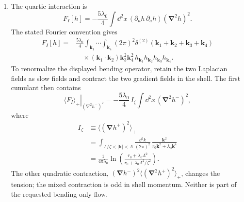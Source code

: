 \begin{enumerate}
\begin{enumerate}
    \item[(c)]
    The quartic interaction is
    \[
      F_I[h]=-\frac{5\lambda_0}{4}\int \dd^2x\,
        (\partial_a h\,\partial_a h)(\boldsymbol\nabla^2h)^2.
    \]
    The stated Fourier convention gives
    \[
      \begin{split}
      F_I[h]
      ={}&\frac{5\lambda_0}{4}
        \int_{\mathbf k_1}\!\cdots\!\int_{\mathbf k_4}
        (2\pi)^2\delta^{(2)}
          (\mathbf k_1+\mathbf k_2+\mathbf k_3+\mathbf k_4)\\
      &\quad{}\times
        (\mathbf k_1\!\cdot\!\mathbf k_2)
        \mathbf k_3^2\mathbf k_4^2\,
        h_{\mathbf k_1}h_{\mathbf k_2}
        h_{\mathbf k_3}h_{\mathbf k_4}.
      \end{split}
      \tag{18.3.S4}
    \]
    To renormalize the displayed bending operator, retain the two
    Laplacian fields as slow fields and contract the two gradient fields in
    the shell.  The first cumulant then contains
    \[
      \left.\langle F_I\rangle_+\right|_{(\nabla^2h^-)^2}
      =-\frac{5\lambda_0}{4}\,I_\zeta
        \int \dd^2x\,(\boldsymbol\nabla^2h^-)^2,
      \tag{18.3.S5}
    \]
    where
    \[
      \begin{split}
      I_\zeta
      &\equiv\bigl\langle
        (\boldsymbol\nabla h^+)^2\bigr\rangle_+\\
      &=\int_{\Lambda/\zeta<|\mathbf k|<\Lambda}
        \frac{\dd^2k}{(2\pi)^2}\,
        \frac{\mathbf k^2}
          {r_0\mathbf k^2+\lambda_0\mathbf k^4}\\
      &=\frac{1}{4\pi\lambda_0}
        \ln\!\left(
          \frac{r_0+\lambda_0\Lambda^2}
               {r_0+\lambda_0\Lambda^2/\zeta^2}
        \right).
      \end{split}
      \tag{18.3.S6}
    \]
    The other quadratic contraction,
    \((\boldsymbol\nabla h^-)^2
      \langle(\boldsymbol\nabla^2h^+)^2\rangle_+\),
    changes the tension; the mixed contraction is odd in shell momentum.
    Neither is part of the requested bending-only flow.


\end{enumerate}
\end{enumerate}
